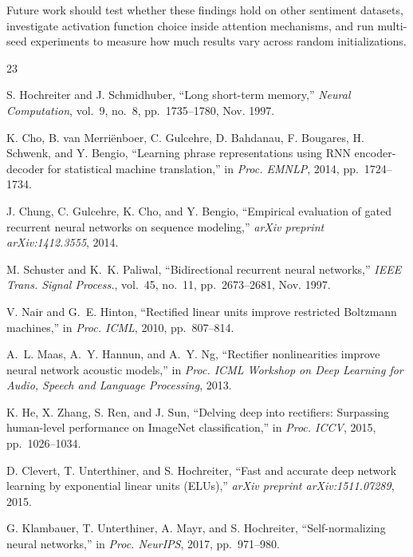 \documentclass[conference]{IEEEtran}
\begin{document}
Future work should test whether these findings hold on
other sentiment datasets, investigate activation function choice
inside attention mechanisms, and run multi-seed experiments to
measure how much results vary across random initializations.

\begin{thebibliography}{23}


S. Hochreiter and J. Schmidhuber,
``Long short-term memory,''
\textit{Neural Computation}, vol.~9, no.~8, pp.~1735--1780, Nov. 1997.

K. Cho, B. van Merri\"{e}nboer, C. Gulcehre, D. Bahdanau, F. Bougares,
H. Schwenk, and Y. Bengio,
``Learning phrase representations using RNN encoder-decoder for statistical
machine translation,''
in \textit{Proc. EMNLP}, 2014, pp.~1724--1734.

J. Chung, C. Gulcehre, K. Cho, and Y. Bengio,
``Empirical evaluation of gated recurrent neural networks on sequence
modeling,''
\textit{arXiv preprint arXiv:1412.3555}, 2014.

M. Schuster and K.~K. Paliwal,
``Bidirectional recurrent neural networks,''
\textit{IEEE Trans. Signal Process.}, vol.~45, no.~11,
pp.~2673--2681, Nov. 1997.


V. Nair and G.~E. Hinton,
``Rectified linear units improve restricted Boltzmann machines,''
in \textit{Proc. ICML}, 2010, pp.~807--814.

A.~L. Maas, A.~Y. Hannun, and A.~Y. Ng,
``Rectifier nonlinearities improve neural network acoustic models,''
in \textit{Proc. ICML Workshop on Deep Learning for Audio, Speech and
Language Processing}, 2013.

K. He, X. Zhang, S. Ren, and J. Sun,
``Delving deep into rectifiers: Surpassing human-level performance on
ImageNet classification,''
in \textit{Proc. ICCV}, 2015, pp.~1026--1034.

D. Clevert, T. Unterthiner, and S. Hochreiter,
``Fast and accurate deep network learning by exponential linear units
(ELUs),''
\textit{arXiv preprint arXiv:1511.07289}, 2015.

G. Klambauer, T. Unterthiner, A. Mayr, and S. Hochreiter,
``Self-normalizing neural networks,''
in \textit{Proc. NeurIPS}, 2017, pp.~971--980.


\end{thebibliography}
\end{document}
